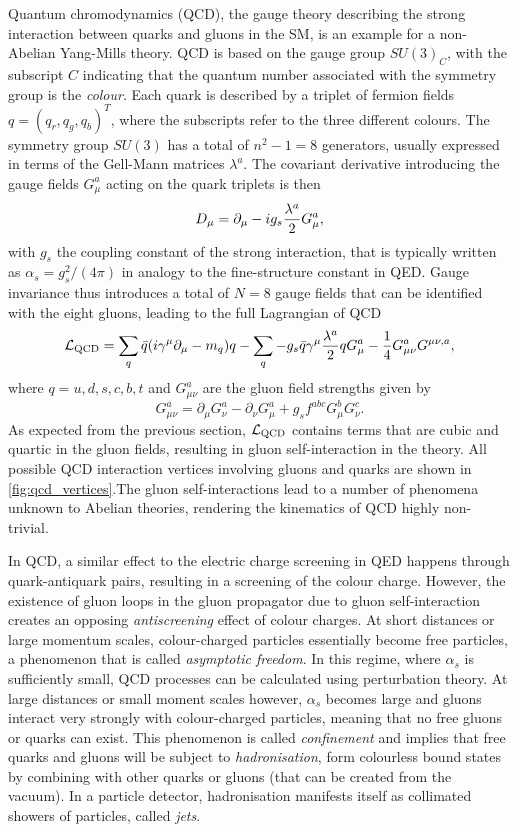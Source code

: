Quantum chromodynamics (QCD), the gauge theory describing the strong interaction between quarks and gluons in the SM, is an example for a non-Abelian Yang-Mills theory. QCD is based on the gauge group $SU(3)_C$, with the subscript $C$ indicating that the quantum number associated with the symmetry group is the \textit{colour}. Each quark is described by a triplet of fermion fields $q = (q_r,q_g,q_b)^T$, where the subscripts refer to the three different colours. The symmetry group $SU(3)$ has a total of $n^2-1 = 8$ generators, usually expressed in terms of the Gell-Mann matrices $\lambda^a$. The covariant derivative introducing the gauge fields $G_\mu^a$ acting on the quark triplets is then
\begin{equation}
	\mathop{}\!D_\mu = \partial_\mu - ig_s \frac{\lambda^a}{2	}G_\mu^a,
\end{equation}
with $g_s$ the coupling constant of the strong interaction, that is typically written as $\alpha_s = g_s^2 / (4\pi)$ in analogy to the fine-structure constant in QED. Gauge invariance thus introduces a total of $N=8$ gauge fields that can be identified with the eight gluons, leading to the full Lagrangian of QCD
\begin{equation}
	\mathcal{L}_\mathrm{QCD} = \sum_q{\bar{q}(i\gamma^\mu\partial_\mu - m_q)q} - \sum_q{-g_s\bar{q}\gamma^\mu\frac{\lambda^a}{2}qG^a_\mu} - \frac{1}{4}G^a_{\mu\nu}G^{\mu\nu,a},
\end{equation}
where $q = u,d,s,c,b,t$ and $G^a_{\mu\nu}$ are the gluon field strengths given by
\begin{equation}
	G^a_{\mu\nu} = \partial_\mu G^a_\nu - \partial_\nu G^a_\mu + g_s f^{abc}G^b_\mu G^c_\nu.
\end{equation}
As expected from the previous section, $\mathcal{L}_\mathrm{QCD}$ contains terms that are cubic and quartic in the gluon fields, resulting in gluon self-interaction in the theory. All possible QCD interaction vertices involving gluons and quarks are shown in \cref{fig:qcd_vertices}.The gluon self-interactions lead to a number of phenomena unknown to Abelian theories, rendering the kinematics of QCD highly non-trivial.

In QCD, a similar effect to the electric charge screening in QED happens through quark-antiquark pairs, resulting in a screening of the colour charge. However, the existence of gluon loops in the gluon propagator due to gluon self-interaction creates an opposing \textit{antiscreening} effect of colour charges. At short distances or large momentum scales, colour-charged particles essentially become free particles, a phenomenon that is called \textit{asymptotic freedom}. In this regime, where $\alpha_s$ is sufficiently small, QCD processes can be calculated using perturbation theory. At large distances or small moment scales however, $\alpha_s$ becomes large and gluons interact very strongly with colour-charged particles, meaning that no free gluons or quarks can exist. This phenomenon is called \textit{confinement} and implies that free quarks and gluons will be subject to \textit{hadronisation}, \ie form colourless bound states by combining with other quarks or gluons (that can be created from the vacuum). In a particle detector, hadronisation manifests itself as collimated showers of particles, called \textit{jets}. 


